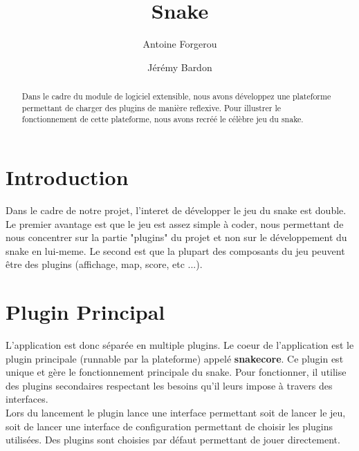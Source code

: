 \documentclass[12pt,a4paper]{article}
\title{Snake}
\author{Antoine Forgerou \and Jérémy Bardon}
\date{}
\begin{document}
\maketitle
\vspace{0.80cm}
\begin{abstract}
    Dans le cadre du module de logiciel extensible, nous avons développez une plateforme permettant de charger des plugins de manière reflexive. Pour illustrer le fonctionnement de cette plateforme, nous avons recréé le célèbre jeu du snake.
\end{abstract} 
\vspace{0.80cm}
\tableofcontents

\newpage

   
    
\section{Introduction}

    Dans le cadre de notre projet, l'interet de développer le jeu du snake est double. Le premier avantage est que le jeu est assez simple à coder, nous permettant de nous concentrer sur la partie "plugins" du projet et non sur le développement du snake en lui-meme. Le second est que la plupart des composants du jeu peuvent être des plugins (affichage, map, score, etc ...).\\
    
\section{Plugin Principal}    
    
    L'application est donc séparée en multiple plugins. Le coeur de l'application est le plugin principale (runnable par la plateforme) appelé \textbf{snakecore}. Ce plugin est unique et gère le fonctionnement principale du snake. Pour fonctionner, il utilise des plugins secondaires respectant les besoins qu'il leurs impose à travers des interfaces.\\

    Lors du lancement le plugin lance une interface permettant soit de lancer le jeu, soit de lancer une interface de configuration permettant de choisir les plugins utilisées. Des plugins sont choisies par défaut permettant de jouer directement. \\
\end{document}
